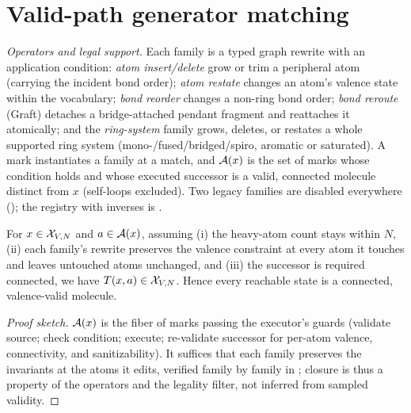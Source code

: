 \section{Valid-path generator matching}
\label{sec:validgm}

\emph{Operators and legal support.} Each family is a typed graph rewrite with an application condition:
\emph{atom insert/delete} grow or trim a peripheral atom (carrying the incident bond order); \emph{atom
restate} changes an atom's valence state within the vocabulary; \emph{bond reorder} changes a non-ring
bond order; \emph{bond reroute} (Graft) detaches a bridge-attached pendant fragment and reattaches it
atomically; and the \emph{ring-system} family grows, deletes, or restates a whole supported ring system
(mono-/fused/bridged/spiro, aromatic or saturated). A mark instantiates a family at a match, and
$\mathcal{A}(x)$ is the set of marks whose condition holds and whose executed successor is a valid, connected
molecule distinct from $x$ (self-loops excluded). Two legacy families are disabled everywhere
(); the registry with inverses is .

\begin{proposition}
\label{prop:closure}
For $x\in\mathcal{X}_{V,N}$ and $a\in\mathcal{A}(x)$, assuming (i) the heavy-atom count stays within $N$, (ii) each family's
rewrite preserves the valence constraint at every atom it touches and leaves untouched atoms unchanged,
and (iii) the successor is required connected, we have $T(x,a)\in\mathcal{X}_{V,N}$. Hence every reachable state
is a connected, valence-valid molecule.
\end{proposition}
\begin{proof}[Proof sketch]
$\mathcal{A}(x)$ is the fiber of marks passing the executor's guards (validate source; check condition; execute;
re-validate successor for per-atom valence, connectivity, and sanitizability). It suffices that each
family preserves the invariants at the atoms it edits, verified family by family in ;
closure is thus a property of the operators and the legality filter, not inferred from sampled validity.
\end{proof}


